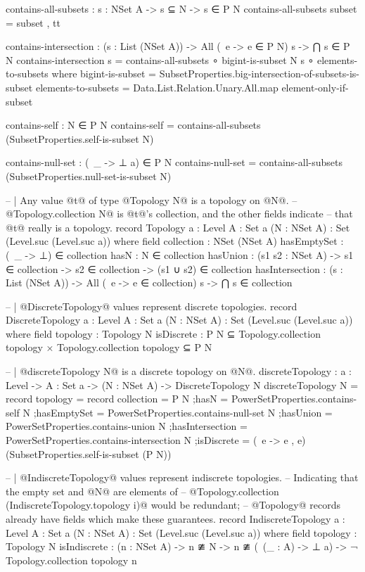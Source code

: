 \begin{code}
  contains-all-subsets : {s : NSet A} -> s ⊆ N -> s ∈ P N
  contains-all-subsets subset = subset , tt

  contains-intersection : (s : List (NSet A)) ->
                          All (\ e -> e ∈ P N) s ->
                          ⋂ s ∈ P N
  contains-intersection s = contains-all-subsets ∘ bigint-is-subset N s ∘ elements-to-subsets
    where
    bigint-is-subset = SubsetProperties.big-intersection-of-subsets-is-subset
    elements-to-subsets = Data.List.Relation.Unary.All.map element-only-if-subset

  contains-self : N ∈ P N
  contains-self = contains-all-subsets (SubsetProperties.self-is-subset N)

  contains-null-set : (\ _ -> ⊥ {a}) ∈ P N
  contains-null-set = contains-all-subsets (SubsetProperties.null-set-is-subset N)

-- | Any value @t@ of type @Topology N@ is a topology on @N@.
-- @Topology.collection N@ is @t@'s collection, and the other fields indicate
-- that @t@ really is a topology.
record Topology {a : Level}
                {A : Set a}
                (N : NSet A) : Set (Level.suc (Level.suc a)) where
  field
    collection : NSet (NSet A)
    hasEmptySet : (\ _ -> ⊥) ∈ collection
    hasN : N ∈ collection
    hasUnion : (s1 s2 : NSet A) ->
               s1 ∈ collection ->
               s2 ∈ collection ->
               (s1 ∪ s2) ∈ collection
    hasIntersection : (s : List (NSet A)) ->
                      All (\ e -> e ∈ collection) s ->
                      ⋂ s ∈ collection

-- | @DiscreteTopology@ values represent discrete topologies.
record DiscreteTopology {a : Level}
                        {A : Set a}
                        (N : NSet A) : Set (Level.suc (Level.suc a)) where
  field
    topology : Topology N
    isDiscrete : P N ⊆ Topology.collection topology ×
                 Topology.collection topology ⊆ P N

-- | @discreteTopology N@ is a discrete topology on @N@.
discreteTopology : {a : Level} -> {A : Set a} -> (N : NSet A) -> DiscreteTopology N
discreteTopology N = record
  {topology = record
     {collection = P N
     ;hasN = PowerSetProperties.contains-self N
     ;hasEmptySet = PowerSetProperties.contains-null-set N
     ;hasUnion = PowerSetProperties.contains-union N
     ;hasIntersection = PowerSetProperties.contains-intersection N
     }
  ;isDiscrete = (\ e -> e , e) (SubsetProperties.self-is-subset (P N))}

-- | @IndiscreteTopology@ values represent indiscrete topologies.
-- Indicating that the empty set and @N@ are elements of
-- @Topology.collection (IndiscreteTopology.topology i)@ would be redundant;
-- @Topology@ records already have fields which make these guarantees.
record IndiscreteTopology {a : Level}
                          {A : Set a}
                          (N : NSet A) : Set (Level.suc (Level.suc a)) where
  field
    topology : Topology N
    isIndiscrete : (n : NSet A) ->
                   n ≇ N ->
                   n ≇ (\ (_ : A) -> ⊥ {a})
                   -> ¬ Topology.collection topology n


\end{code}
